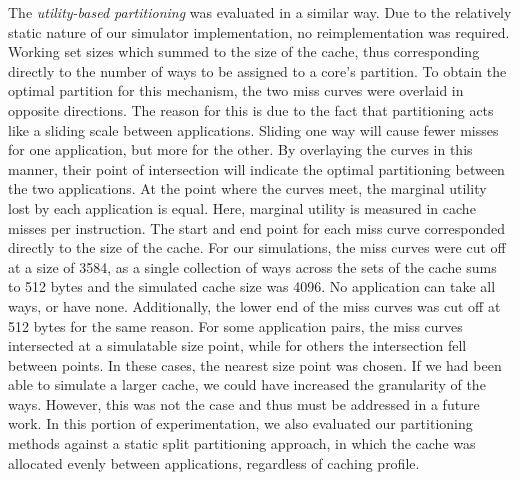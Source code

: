 \documentclass{acm_proc_article-sp}
\begin{document}
The \emph{utility-based partitioning} was evaluated in a similar way.
Due to the relatively static nature of our simulator implementation, no reimplementation
was required. Working set sizes which summed to the size of the cache, thus
corresponding directly to the number of ways to be assigned to a core's partition.
To obtain the optimal partition for this mechanism, the two miss curves were overlaid
in opposite directions. The reason for this is due to the fact that partitioning acts like a sliding scale
between applications. Sliding one way will cause fewer misses for one application, but more for the
other. By overlaying the curves in this manner, their point of intersection will indicate the optimal partitioning
between the two applications. At the point where the curves meet, the marginal utility lost by each application
is equal. Here, marginal utility is measured in cache misses per instruction. The start and end point for each miss curve corresponded directly to the size of the cache. For our simulations, the miss curves were cut off at a size of 3584,
as a single collection of ways across the sets of the cache sums to 512 bytes and the simulated cache size was 4096. No
application can take all ways, or have none. Additionally, the lower end of the miss curves was cut off at 512 bytes for the same reason. For some application pairs, the miss curves intersected at a simulatable
size point, while for others the intersection fell between points. In these cases, the nearest size point was chosen. 
If we had been able to simulate a larger cache, we could have increased the granularity of the ways. However,
this was not the case and thus must be addressed in a future work. In this portion of experimentation, we also evaluated
our partitioning methods against a static split partitioning approach, in which the cache was allocated evenly between applications, regardless of caching profile. 
\end{document}
